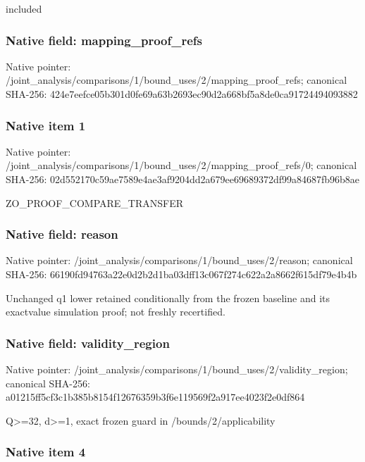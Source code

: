 \documentclass[10pt,a4paper]{article}
\begin{document}
included


\subsubsection{Native field: mapping\_proof\_refs}


Native pointer: /joint\_analysis/comparis\allowbreak{}ons/1/bound\_uses/2/mappi\allowbreak{}ng\_proof\_refs; canonical SHA-256: 424e7eefce05b301d0fe69a6\allowbreak{}3b2693ec90d2a668bf5a8de0\allowbreak{}ca91724494093882



\subsubsection{Native item 1}


Native pointer: /joint\_analysis/comparis\allowbreak{}ons/1/bound\_uses/2/mappi\allowbreak{}ng\_proof\_refs/0; canonical SHA-256: 02d552170c59ae7589e4ae3a\allowbreak{}f9204dd2a679ee69689372df\allowbreak{}99a84687fb96b8ae


ZO\_PROOF\_COMPARE\_TRANSFER


\subsubsection{Native field: reason}


Native pointer: /joint\_analysis/comparis\allowbreak{}ons/1/bound\_uses/2/reaso\allowbreak{}n; canonical SHA-256: 66190fd94763a22e0d2b2d1b\allowbreak{}a03dff13c067f274c622a2a8\allowbreak{}662f615df79e4b4b


Unchanged q1 lower retained conditionally from the frozen baseline and its exactvalue simulation proof; not freshly recertified.


\subsubsection{Native field: validity\_region}


Native pointer: /joint\_analysis/comparis\allowbreak{}ons/1/bound\_uses/2/valid\allowbreak{}ity\_region; canonical SHA-256: a01215ff5cf3c1b385b8154f\allowbreak{}12676359b3f6e119569f2a91\allowbreak{}7ee4023f2e0df864


Q>=32, d>=1, exact frozen guard in /bounds/2/applicability


\subsubsection{Native item 4}
\end{document}

